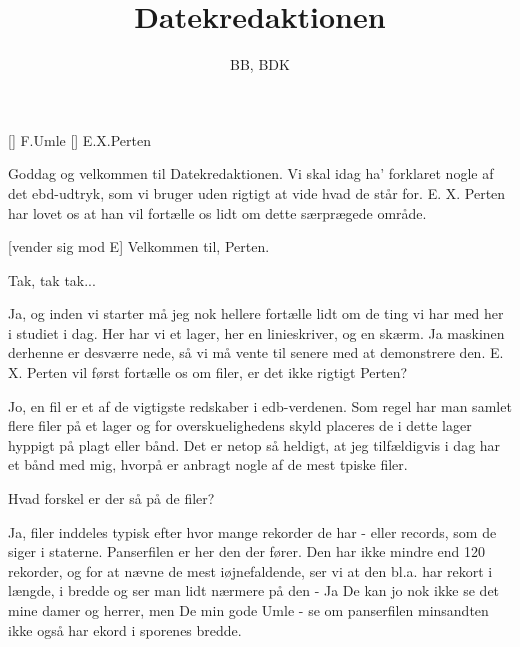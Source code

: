 \documentclass[a4paper,11pt]{article}
\title{Datekredaktionen}
\author{BB, BDK}
\begin{document}
\maketitle

\begin{roles}
  [] F.Umle
  [] E.X.Perten
\end{roles}

\begin{sketch}


   Goddag og velkommen til Datekredaktionen.  Vi skal idag ha'
  forklaret nogle af det ebd-udtryk, som vi bruger uden rigtigt at
  vide hvad de står for.  E. X. Perten har lovet os at han vil
  fortælle os lidt om dette særprægede område.

  [vender sig mod E] Velkommen til, Perten.

   Tak, tak tak...

   Ja, og inden vi starter må jeg nok hellere fortælle lidt om
  de ting vi har med her i studiet i dag.  Her har vi et lager, her en
  linieskriver, og en skærm.  Ja maskinen derhenne er desværre nede,
  så vi må vente til senere med at demonstrere den.   E. X. Perten vil først fortælle os om filer, er det
  ikke rigtigt Perten?

   Jo, en fil er et af de vigtigste redskaber i edb-verdenen.
  Som regel har man samlet flere filer på et lager og for
  overskuelighedens skyld placeres de i dette lager hyppigt på plagt
  eller bånd.  Det er netop så heldigt, at jeg tilfældigvis i dag har
  et bånd med mig, hvorpå er anbragt nogle af de mest tpiske filer.


   Hvad forskel er der så på de filer?

   Ja, filer inddeles typisk efter hvor mange rekorder de har
  - eller records, som de siger i staterne.  Panserfilen er her den
  der fører.  Den har ikke mindre end 120 rekorder, og for at nævne de
  mest iøjnefaldende, ser vi at den bl.a. har rekort i længde, i
  bredde og ser man lidt nærmere på den - Ja De kan jo nok ikke se det
  mine damer og herrer, men De min gode Umle - se om panserfilen
  minsandten ikke også har ekord i sporenes bredde.


\end{sketch}
\end{document}
